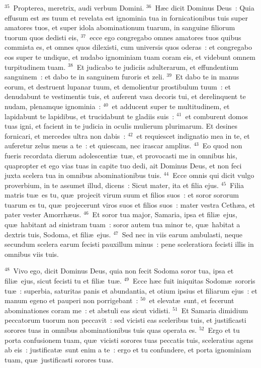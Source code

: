 ${}^{35}$~Propterea, meretrix, audi verbum Domini.
${}^{36}$~H\ae c dicit Dominus Deus~: Quia effusum est \ae s tuum et revelata est ignominia tua in fornicationibus tuis super amatores tuos, et super idola abominationum tuarum, in sanguine filiorum tuorum quos dedisti eis,
${}^{37}$~ecce ego congregabo omnes amatores tuos quibus commista es, et omnes quos dilexisti, cum universis quos oderas~: et congregabo eos super te undique, et nudabo ignominiam tuam coram eis, et videbunt omnem turpitudinem tuam.
${}^{38}$~Et judicabo te judiciis adulterarum, et effundentium sanguinem~: et dabo te in sanguinem furoris et zeli.
${}^{39}$~Et dabo te in manus eorum, et destruent lupanar tuum, et demolientur prostibulum tuum~: et denudabunt te vestimentis tuis, et auferent vasa decoris tui, et derelinquent te nudam, plenamque ignominia~:
${}^{40}$~et adducent super te multitudinem, et lapidabunt te lapidibus, et trucidabunt te gladiis suis~:
${}^{41}$~et comburent domos tuas igni, et facient in te judicia in oculis mulierum plurimarum. Et desines fornicari, et mercedes ultra non dabis~:
${}^{42}$~et requiescet indignatio mea in te, et auferetur zelus meus a te~: et quiescam, nec irascar amplius.
${}^{43}$~Eo quod non fueris recordata dierum adolescenti\ae\ tu\ae , et provocasti me in omnibus his, quapropter et ego vias tuas in capite tuo dedi, ait Dominus Deus, et non feci juxta scelera tua in omnibus abominationibus tuis.
${}^{44}$~Ecce omnis qui dicit vulgo proverbium, in te assumet illud, dicens~: Sicut mater, ita et filia ejus.
${}^{45}$~Filia matris tu\ae\ es tu, qu\ae\ projecit virum suum et filios suos~: et soror sororum tuarum es tu, qu\ae\ projecerunt viros suos et filios suos~: mater vestra Ceth\ae a, et pater vester Amorrh\ae us.
${}^{46}$~Et soror tua major, Samaria, ipsa et fili\ae\ ejus, qu\ae\ habitant ad sinistram tuam~: soror autem tua minor te, qu\ae\ habitat a dextris tuis, Sodoma, et fili\ae\ ejus.
${}^{47}$~Sed nec in viis earum ambulasti, neque secundum scelera earum fecisti pauxillum minus~: pene sceleratiora fecisti illis in omnibus viis tuis.


${}^{48}$~Vivo ego, dicit Dominus Deus, quia non fecit Sodoma soror tua, ipsa et fili\ae\ ejus, sicut fecisti tu et fili\ae\ tu\ae .
${}^{49}$~Ecce h\ae c fuit iniquitas Sodom\ae\ sororis tu\ae~: superbia, saturitas panis et abundantia, et otium ipsius et filiarum ejus~: et manum egeno et pauperi non porrigebant~:
${}^{50}$~et elevat\ae\ sunt, et fecerunt abominationes coram me~: et abstuli eas sicut vidisti.
${}^{51}$~Et Samaria dimidium peccatorum tuorum non peccavit~: sed vicisti eas sceleribus tuis, et justificasti sorores tuas in omnibus abominationibus tuis quas operata es.
${}^{52}$~Ergo et tu porta confusionem tuam, qu\ae\ vicisti sorores tuas peccatis tuis, sceleratius agens ab eis~: justificat\ae\ sunt enim a te~: ergo et tu confundere, et porta ignominiam tuam, qu\ae\ justificasti sorores tuas.


